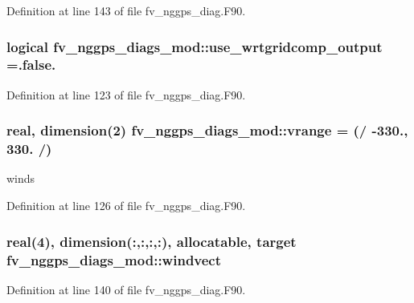 Definition at line 143 of file fv\-\_\-nggps\-\_\-diag.\-F90.

\subsubsection[{use\-\_\-wrtgridcomp\-\_\-output}]{\setlength{\rightskip}{0pt plus 5cm}logical fv\-\_\-nggps\-\_\-diags\-\_\-mod\-::use\-\_\-wrtgridcomp\-\_\-output =.false.\hspace{0.3cm}{\ttfamily [private]}}\label{classfv__nggps__diags__mod_a70632914cad68cbfde798ff630987d0f}


Definition at line 123 of file fv\-\_\-nggps\-\_\-diag.\-F90.

\subsubsection[{vrange}]{\setlength{\rightskip}{0pt plus 5cm}real, dimension(2) fv\-\_\-nggps\-\_\-diags\-\_\-mod\-::vrange = (/ -\/330., 330. /)\hspace{0.3cm}{\ttfamily [private]}}\label{classfv__nggps__diags__mod_a09ecb76f21e39af3216eb05b1b913419}


winds 



Definition at line 126 of file fv\-\_\-nggps\-\_\-diag.\-F90.

\subsubsection[{windvect}]{\setlength{\rightskip}{0pt plus 5cm}real(4), dimension(\-:,\-:,\-:,\-:), allocatable, target fv\-\_\-nggps\-\_\-diags\-\_\-mod\-::windvect\hspace{0.3cm}{\ttfamily [private]}}\label{classfv__nggps__diags__mod_ad92d40cf9570d98ea35bc7da2815dc38}


Definition at line 140 of file fv\-\_\-nggps\-\_\-diag.\-F90.

